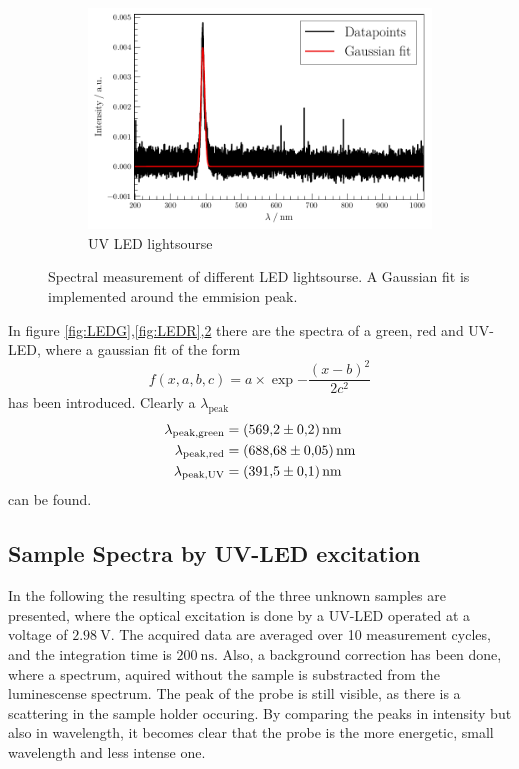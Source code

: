 \begin{figure}
\begin{subfigure}{.32\textwidth}
    \includegraphics[width=\textwidth]{plots/LED-UV.pdf}
  \caption{UV LED lightsourse}
    \label{fig:LEDUV}
\end{subfigure}
\caption{Spectral measurement of different LED lightsourse. A Gaussian fit is implemented around the emmision peak.}
\end{figure}


In figure \ref{fig:LEDG},\ref{fig:LEDR},\ref{fig:LEDUV} there are the spectra of a green, red and UV-LED, where a gaussian fit of the form 
\begin{equation}
    f(x,a,b,c) = a \times \exp{-\frac{(x-b)^2}{2 c^2}}
\end{equation}\label{eq:gauss}
has been introduced. Clearly a $\lambda_\text{peak}$ 
\begin{align*}
    \lambda_\text{peak,green} &= \SI{569.2 \pm 0.2}{\nano\meter} \\
    \lambda_\text{peak,red} &= \SI{688.68 \pm 0.05}{\nano\meter} \\
    \lambda_\text{peak,UV} &= \SI{391.5 \pm 0.1}{\nano\meter} \\
\end{align*}
can be found.

\subsection{Sample Spectra by UV-LED excitation}
\label{sec:samp_LED}

In the following the resulting spectra of the three unknown samples are presented, where the optical excitation is done by a UV-LED operated at a voltage of $\SI{2.98}{\volt}$.
The acquired data are averaged over 10 measurement cycles, and the integration time is $\SI{200}{\nano\second}$.
Also, a background correction has been done, where a spectrum, aquired without the sample is substracted from the luminescense spectrum.
The peak of the probe is still visible, as there is a scattering in the sample holder occuring.
By comparing the peaks in intensity but also in wavelength, it becomes clear that the probe is the more energetic, small wavelength and less intense one.


